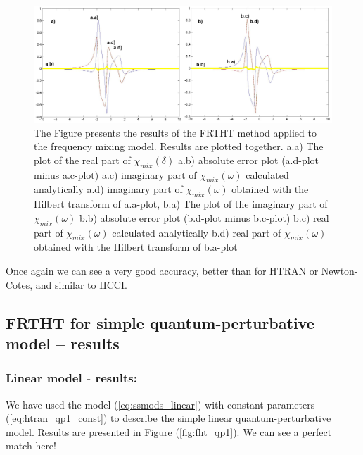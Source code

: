 \documentclass[12pt,twoside,a4paper]{article}
\numberwithin{equation}{subsection}
\numberwithin{figure}{subsection}
\begin{document}
\begin{figure} 
  \includegraphics[width=150mm]{img/fht_fmix.png}
  \caption{The Figure presents the results of the FRTHT method applied to the frequency mixing model. Results are plotted together.
     a.a) The plot of the real part of ${\chi_{mix}}(\delta )$
     a.b) absolute error plot (a.d-plot minus a.c-plot) 
     a.c) imaginary part of $\chi_{mix}(\omega )$ calculated analytically 
     a.d) imaginary part of $\chi_{mix}(\omega )$ obtained with the Hilbert transform of a.a-plot, 
     b.a) The plot of the imaginary part of $\chi_{mix}(\omega )$ 
     b.b) absolute error plot (b.d-plot minus b.c-plot) 
     b.c) real part of $\chi_{mix} (\omega )$ calculated analytically 
     b.d) real part of $\chi_{mix} (\omega )$ obtained with the Hilbert transform of b.a-plot 
     \label{fig:fht_fmix}
     }
\end{figure}

Once again we can see a very good accuracy, better than for HTRAN or Newton-Cotes, and similar to HCCI.

\subsection{FRTHT for simple quantum-perturbative model -- results} \label{chap:hartley_quantum}

\subsubsection*{Linear model - results:}

We have used the model (\ref{eq:ssmods_linear}) with constant parameters (\ref{eq:htran_qp1_const}) to describe the simple linear quantum-perturbative model. Results are presented in Figure (\ref{fig:fht_qp1}). We can see a perfect match here!
\end{document}

